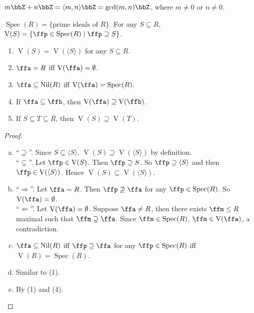 \begin{example}
    $m\bbZ + n\bbZ = \langle m,n \rangle\bbZ = \operatorname{gcd}(m,n)\bbZ$, where $m \neq 0$ or $n \neq 0$.
\end{example}

\begin{remark}[Recall]
    $\operatorname{Spec}(R) = \{\text{prime ideals of $R$}\}$. For any $S \subseteq R$, $\operatorname{V}(S) = \{\ffp \in \operatorname{Spec}(R) \mid \ffp \supseteq S\}$.
\end{remark}

\begin{proposition}
    \begin{enumerate}[(1)]
        \item $\operatorname{V}(S) = \operatorname{V}(\langle S \rangle)$ for any $S \subseteq R$.
        \item $\ffa = R$ iff $\operatorname{V}(\ffa) = \emptyset$.
        \item $\ffa \subseteq \operatorname{Nil}(R)$ iff $\operatorname{V}(\ffa) = \operatorname{Spec}(R)$.
        \item If $\ffa \subseteq \ffb$, then $\operatorname{V}(\ffa) \supseteq \operatorname{V}(\ffb)$. 
        \item If $S \subseteq T \subseteq R$, then $\operatorname{V}(S) \supseteq \operatorname{V}(T)$.
    \end{enumerate}
\end{proposition}

\begin{proof}
    \begin{enumerate}[(a)]
        \item 
            ``$\supseteq$''. Since $S \subseteq \langle S \rangle$, $\operatorname{V}(S) \supseteq \operatorname{V}(\langle S \rangle)$ by definition. \\
            ``$\subseteq$''. Let $\ffp \in \operatorname{V}(S)$. Then $\ffp \supseteq S$. So $\ffp \supseteq \langle S \rangle$ and then $\ffp \in \operatorname{V}(\langle S \rangle)$. Hence $\operatorname{V}(S) \subseteq \operatorname{V}(\langle S \rangle)$.
        \item 
            ``$\Rightarrow$''. Let $\ffa = R$. Then $\ffp \not \supseteq \ffa$ for any $\ffp \in \operatorname{Spec}(R)$. So $\operatorname{V}(\ffa) = \emptyset$. \\
            ``$\Leftarrow$''. Let $\operatorname{V}(\ffa) = \emptyset$. Suppose $\ffa \neq R$, then there exists $\ffm \leq R$ maximal such that $\ffm \supseteq \ffa$. Since $\ffm \in \operatorname{Spec}(R)$, $\ffm \in \operatorname{V}(\ffa)$, a contradiction.
        \item $\ffa \subseteq \operatorname{Nil}(R)$ iff $\ffp \supseteq \ffa$ for any $\ffp \in \operatorname{Spec}(R)$ iff $\operatorname{V}(R) = \operatorname{Spec}(R)$.
        \item Similar to (1).
        \item By (1) and (4).
    \end{enumerate}
\end{proof}

